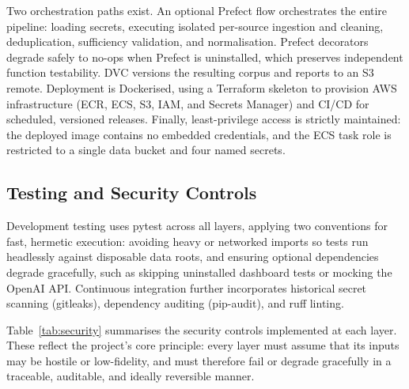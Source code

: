 \documentclass[conference]{IEEEtran}
\begin{document}
Two orchestration paths exist. An optional Prefect flow orchestrates the entire pipeline: loading secrets, executing isolated per-source ingestion and cleaning, deduplication, sufficiency validation, and normalisation. Prefect decorators degrade safely to no-ops when Prefect is uninstalled, which preserves independent function testability. DVC versions the resulting corpus and reports to an S3 remote. Deployment is Dockerised, using a Terraform skeleton to provision AWS infrastructure (ECR, ECS, S3, IAM, and Secrets Manager) and CI/CD for scheduled, versioned releases. Finally, least-privilege access is strictly maintained: the deployed image contains no embedded credentials, and the ECS task role is restricted to a single data bucket and four named secrets.

\subsection{Testing and Security Controls}

Development testing uses pytest across all layers, applying two conventions for fast, hermetic execution: avoiding heavy or networked imports so tests run headlessly against disposable data roots, and ensuring optional dependencies degrade gracefully, such as skipping uninstalled dashboard tests or mocking the OpenAI API. Continuous integration further incorporates historical secret scanning (gitleaks), dependency auditing (pip-audit), and ruff linting.

Table~\ref{tab:security} summarises the security controls implemented at each layer. These reflect the project's core principle: every layer must assume that its inputs may be hostile or low-fidelity, and must therefore fail or degrade gracefully in a traceable, auditable, and ideally reversible manner.
\end{document}
